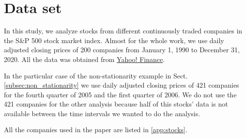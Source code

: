 \section{Data set}\label{sec:data_set}

In this study, we analyze stocks from different continuously traded companies
in the S\&P 500 stock market index. Almost for the whole work, we use daily
adjusted closing prices of 200 companies from January 1, 1990 to December 31,
2020. All the data was obtained from
\href{https://finance.yahoo.com/}{Yahoo! Finance}.

In the particular case of the non-stationarity example in Sect.
\ref{subsec:non_stationarity} we use daily adjusted closing prices of 421
companies for the fourth quarter of 2005 and the first quarter of 2006. We do
not use the 421 companies for the other analysis because half of this stocks'
data is not available between the time intervals we wanted to do the analysis.

All the companies used in the paper are listed in  \ref{app:stocks}.